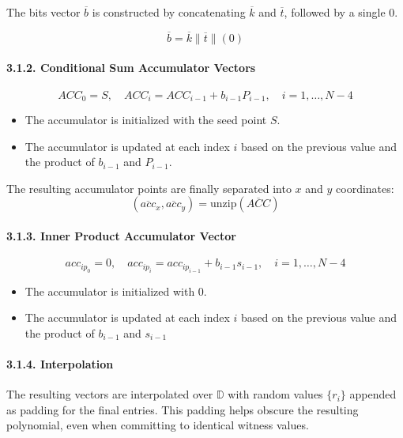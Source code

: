 \documentclass[
]{article}
\providecommand{\tightlist}{%
  \setlength{\itemsep}{0pt}\setlength{\parskip}{0pt}}
\begin{document}
The bits vector \(\overline{b}\) is constructed by concatenating
\(\overline{k}\) and \(\overline{t}\), followed by a single 0.

\[\overline{b} = \overline{k} \| \overline{t} \| (0)\]

\hypertarget{conditional-sum-accumulator-vectors}{%
\paragraph{3.1.2. Conditional Sum Accumulator
Vectors}\label{conditional-sum-accumulator-vectors}}

\[
ACC_0 = S, \quad ACC_i = ACC_{i-1} + b_{i-1}P_{i-1}, \quad i = 1, \ldots, N-4
\]

\begin{itemize}
\tightlist
\item
  The accumulator is initialized with the seed point \(S\).
\item
  The accumulator is updated at each index \(i\) based on the previous
  value and the product of \(b_{i-1}\) and \(P_{i-1}\).
\end{itemize}

The resulting accumulator points are finally separated into \(x\) and
\(y\) coordinates: \[
(\overline{acc}_x, \overline{acc}_y) = \text{unzip}(\overline{ACC})
\]

\hypertarget{inner-product-accumulator-vector}{%
\paragraph{3.1.3. Inner Product Accumulator
Vector}\label{inner-product-accumulator-vector}}

\[
acc_{ip_0} = 0, \quad acc_{ip_i} = acc_{ip_{i-1}} + b_{i-1}s_{i-1}, \quad i = 1, \ldots, N-4
\]

\begin{itemize}
\tightlist
\item
  The accumulator is initialized with \(0\).
\item
  The accumulator is updated at each index \(i\) based on the previous
  value and the product of \(b_{i-1}\) and \(s_{i-1}\)
\end{itemize}

\hypertarget{interpolation-1}{%
\paragraph{3.1.4. Interpolation}\label{interpolation-1}}

The resulting vectors are interpolated over \(\mathbb{D}\) with random
values \(\{r_i\}\) appended as padding for the final entries. This
padding helps obscure the resulting polynomial, even when committing to
identical witness values.
\end{document}
